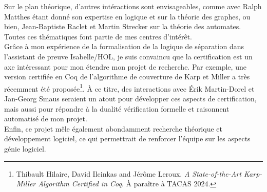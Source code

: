 Sur le plan théorique, d'autres intéractions sont envisageables, comme avec
Ralph Matthes étant donné son expertise en logique et sur la théorie des
graphes, ou bien, Jean-Baptiste Raclet et Martin Strecker sur la théorie des
automates. Toutes ces thématiques font partie de mes centres d'intérêt.\\

Grâce à mon expérience de la formalisation de la logique de séparation dans
l'assistant de preuve Isabelle/HOL, je suis convaincu que la certification est
un axe intéressant pour mon étendre mon projet de recherche. Par exemple, une
version certifiée en Coq de l'algorithme de couverture de Karp et Miller a très
récemment été proposée\footnote{ Thibault Hilaire, David Ilcinkas and Jérôme
Leroux. \textit{A State-of-the-Art Karp-Miller Algorithm Certified in Coq}. À
paraître à TACAS 2024.}. À ce titre, des interactions avec Érik Martin-Dorel et
Jan-Georg Smaus seraient un atout pour développer ces aspects de certification,
mais aussi pour répondre à la dualité vérification formelle et raisonnent automatisé de
mon projet.\\

Enfin, ce projet mêle également abondamment recherche théorique et
développement logiciel, ce qui permettrait de renforcer l'équipe sur les aspects
génie logiciel.



